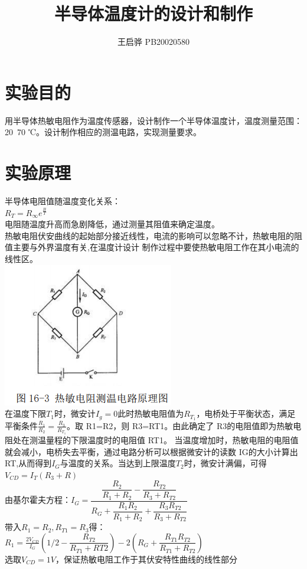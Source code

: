 \documentclass{report}
\title{半导体温度计的设计和制作}
\author{王启骅 PB20020580}
\begin{document}
	\maketitle
	\section{实验目的}
	用半导体热敏电阻作为温度传感器，设计制作一个半导体温度计，温度测量范围：20~70 ℃。设计制作相应的测温电路，实现测量要求。
	\section{实验原理}
	半导体电阻值随温度变化关系：\\
		$ R_T=R_{\infty}e^{\frac{B}{T}} $\\

	电阻随温度升高而急剧降低，通过测量其阻值来确定温度。\\
	热敏电阻伏安曲线的起始部分接近线性，电流的影响可以忽略不计，热敏电阻的阻值主要与外界温度有关,在温度计设计
	制作过程中要使热敏电阻工作在其小电流的线性区。\\
	\includegraphics{1}\\
		在温度下限$ T_1 $时，微安计$ I_g=0 $此时热敏电阻值为$  R_{T_1} $，电桥处于平衡状态，满足平衡条件$ \frac{R_1}{R_2}=\frac{R_3}{R_{T_1}} $。取 R1=R2，则 R3=RT1。由此确定了 R3的电阻值即为热敏电阻处在测温量程的下限温度时的电阻值 RT1。
当温度增加时，热敏电阻的电阻值就会减小，电桥失去平衡，通过电路分析可以根据微安计的读数 IG的大小计算出 RT,从而得到$ I_G $与温度的关系。当达到上限温度$ T_2 $时，微安计满偏，可得$ V_{CD}=I_T(R_3+R) $\\
	由基尔霍夫方程：$ I_G=\dfrac{\dfrac{R_2}{R_1+R_2}-\dfrac{R_{T2}}{R_3+R_{T2}}}{R_G+\dfrac{R_1R_2}{R_1+R_2}+\dfrac{R_3R_{T2}}{R_3+R_{T2}}} $\\
	带入$ R_1=R_2,R_{T1}=R_3 $得：\\$ R_1=\frac{2V_{CD}}{I_G}(1/2-\dfrac{R_{T2}}{R_{T1}+R{T2}})-2(R_G+\dfrac{R_{T1}R_{T2}}{R_{T1}+R_{T2}}) $\\
	选取$ V_{CD}=1V $，保证热敏电阻工作于其伏安特性曲线的线性部分
\end{document}
